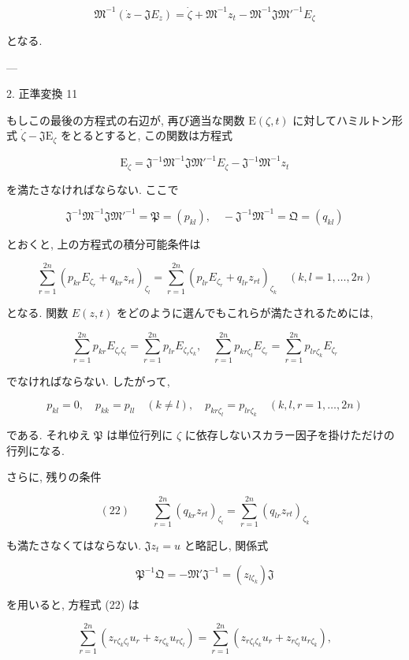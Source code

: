 \documentclass[dvipdfmx, leqno]{jsbook}
\begin{document}
$$\mathfrak{M}^{-1}(\dot{z} - \mathfrak{J} E_z) = \dot{\zeta} + \mathfrak{M}^{-1} z_t - \mathfrak{M}^{-1} \mathfrak{J} \mathfrak{M}'^{-1} E_\zeta$$

となる.

---

2. 正準変換 11

もしこの最後の方程式の右辺が, 再び適当な関数 $\mathrm{E}(\zeta, t)$ に対してハミルトン形式 $\dot{\zeta} - \mathfrak{J} \mathrm{E}_\zeta$ をとるとすると, この関数は方程式

$$\mathrm{E}_\zeta = \mathfrak{J}^{-1} \mathfrak{M}^{-1} \mathfrak{J} \mathfrak{M}'^{-1} E_\zeta - \mathfrak{J}^{-1} \mathfrak{M}^{-1} z_t$$

を満たさなければならない. ここで

$$\mathfrak{J}^{-1} \mathfrak{M}^{-1} \mathfrak{J} \mathfrak{M}'^{-1} = \mathfrak{P} = (p_{kl}), \quad -\mathfrak{J}^{-1} \mathfrak{M}^{-1} = \mathfrak{Q} = (q_{kl})$$

とおくと, 上の方程式の積分可能条件は

$$\sum_{r=1}^{2n} (p_{kr} E_{\zeta_r} + q_{kr} z_{rt})_{\zeta_l} = \sum_{r=1}^{2n} (p_{lr} E_{\zeta_r} + q_{lr} z_{rt})_{\zeta_k} \quad (k,l=1,\dots,2n)$$

となる. 関数 $E(z,t)$ をどのように選んでもこれらが満たされるためには,

$$\sum_{r=1}^{2n} p_{kr} E_{\zeta_r \zeta_l} = \sum_{r=1}^{2n} p_{lr} E_{\zeta_r \zeta_k}, \quad \sum_{r=1}^{2n} p_{kr \zeta_l} E_{\zeta_r} = \sum_{r=1}^{2n} p_{lr \zeta_k} E_{\zeta_r}$$

でなければならない. したがって,

$$p_{kl} = 0, \quad p_{kk} = p_{ll} \quad (k \neq l), \quad p_{kr \zeta_l} = p_{lr \zeta_k} \quad (k,l,r=1,\dots,2n)$$

である. それゆえ $\mathfrak{P}$ は単位行列に $\zeta$ に依存しないスカラー因子を掛けただけの行列になる.

さらに, 残りの条件

$$(22) \qquad \sum_{r=1}^{2n} (q_{kr} z_{rt})_{\zeta_l} = \sum_{r=1}^{2n} (q_{lr} z_{rt})_{\zeta_k}$$

も満たさなくてはならない. $\mathfrak{J} z_t = u$ と略記し, 関係式

$$\mathfrak{P}^{-1} \mathfrak{Q} = -\mathfrak{M}' \mathfrak{J}^{-1} = (z_{l\zeta_k})\mathfrak{J}$$

を用いると, 方程式 (22) は

$$\sum_{r=1}^{2n} (z_{r\zeta_k \zeta_l} u_r + z_{r\zeta_k} u_{r\zeta_l}) = \sum_{r=1}^{2n} (z_{r\zeta_l \zeta_k} u_r + z_{r\zeta_l} u_{r\zeta_k}),$$
\end{document}
